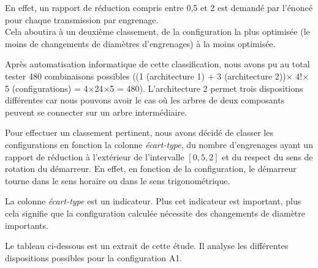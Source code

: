 \documentclass{config}
\begin{document}
\begin{spacing}{1.2}
En effet, un rapport de réduction compris entre 0,5 et 2 est demandé par l'énoncé pour chaque transmission par engrenage.\\
Cela aboutira à un deuxième classement, de la configuration la plus optimisée (le moins de changements de diamètres d'engrenages) à la moins optimisée.

Après automatisation informatique de cette classification, nous avons pu au total tester 480 combinaisons possibles ((1 (architecture 1) + 3 (architecture 2))$\times$ 4!$\times$ 5 (configurations) = 4$\times$24$\times$5 = 480). L'architecture 2 permet trois dispositions différentes car nous pouvons avoir le cas où les arbres de deux composants peuvent se connecter sur un arbre intermédiaire.

Pour effectuer un classement pertinent, nous avons décidé de classer les configurations en fonction la colonne \textit{écart-type}, du nombre d'engrenages ayant un rapport de réduction à l'extérieur de l'intervalle $[0,5,2]$ et du respect du sens de rotation du démarreur. En effet, en fonction de la configuration, le démarreur tourne dans le sens horaire ou dans le sens trigonométrique. 

La colonne \textit{écart-type} est un indicateur. Plus cet indicateur est important, plus cela signifie que la configuration calculée nécessite des changements de diamètre importants. 

Le tableau ci-dessous est un extrait de cette étude. Il analyse les différentes dispositions possibles pour la configuration A1.


\end{spacing}
\end{document}
